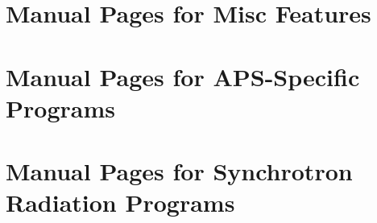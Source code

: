 \documentclass[11pt]{article}
\begin{document}
\section{Manual Pages for Misc Features}



\newpage
\section{Manual Pages for APS-Specific Programs}




\newpage
\section{Manual Pages for Synchrotron Radiation Programs}
\label{SyncManualPages}



\tableofcontents
\end{document}
